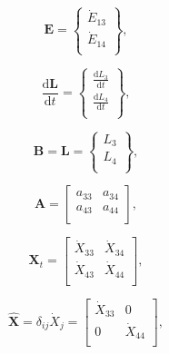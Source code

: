 \documentclass[authoryear,preprint,review,12pt]{elsarticle}
\let\oldhat\hat
\renewcommand{\vec}[1]{\mathbf{#1}}
\renewcommand{\hat}[1]{\oldhat{\mathbf{#1}}}
\begin{document}
\begin{equation} \label{eq:D-E_vec_def}
	\vec{E} =		\begin{Bmatrix} 	\dot{E}_{13}	\\
													\dot{E}_{14}\\
						\end{Bmatrix},
\end{equation}

\begin{equation} \label{eq:D-dLdt_vec_def}
	\frac{\mathrm{d}\vec{L}}{\mathrm{d}t} =	\begin{Bmatrix}	\frac{\mathrm{d}L_{3}}{\mathrm{d}t}	\\
																									\frac{\mathrm{d}L_{4}}{\mathrm{d}t}\\
																		\end{Bmatrix},
\end{equation}

\begin{equation} \label{eq:B_vec_def}
	\vec{B} =	\vec{L} =		\begin{Bmatrix}	L_{3}\\
																	L_{4}\\
										\end{Bmatrix},
\end{equation}

\begin{equation} \label{eq:D-A_matrix_def}
	\vec{A} =	\begin{bmatrix} 	a_{33} & a_{34}	\\
												a_{43} & a_{44}	\\
					\end{bmatrix},
\end{equation}

\begin{equation} \label{eq:D-X_t_matrix_def}
	\vec{X}_{t} =		\begin{bmatrix} 	\dot{X}_{33}		&	\dot{X}_{34}	\\
														\dot{X}_{43}		&	\dot{X}_{44}\\
							\end{bmatrix},
\end{equation}

\begin{equation} \label{eq:D-X_hat_matrix_def}
	\hat{\vec{X}} = \delta_{ij}\dot{X}_{j} = \begin{bmatrix} 	\dot{X}_{33}		&	0					\\
																								0					&	\dot{X}_{44}	\\
																							\end{bmatrix},
\end{equation}
\end{document}
